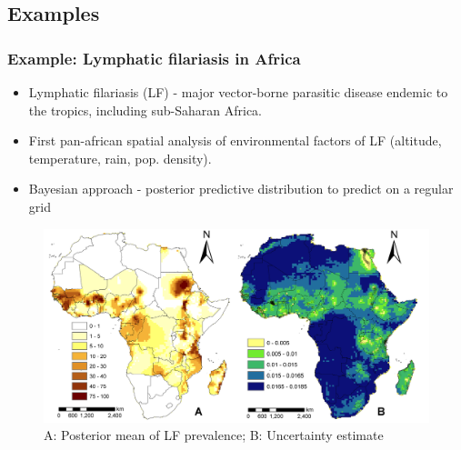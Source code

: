 \documentclass[slidestop,compress,serif,10pt]{beamer}
\begin{document}
\subsection{Examples}
\begin{frame}\frametitle{Example: Lymphatic filariasis in Africa}
\begin{itemize}
\item Lymphatic filariasis (LF) - major vector-borne parasitic
disease endemic to the tropics, including sub-Saharan Africa.
\item First pan-african spatial analysis of environmental factors of LF (altitude, temperature, rain, pop. density).
\item Bayesian approach - posterior predictive distribution to predict on a regular grid
\end{itemize}
\begin{figure}[!h]
\includegraphics[scale=0.4]{journalpone0071574g004}\caption{A: Posterior mean of LF prevalence; B: Uncertainty estimate}   
\end{figure}
\fontsize{7}{7}\selectfont{Slater H, Michael E (2013) Mapping, Bayesian Geostatistical Analysis and Spatial Prediction of Lymphatic Filariasis Prevalence in Africa. PLoS ONE 8(8):e71574.}
\end{frame}
\end{document}
